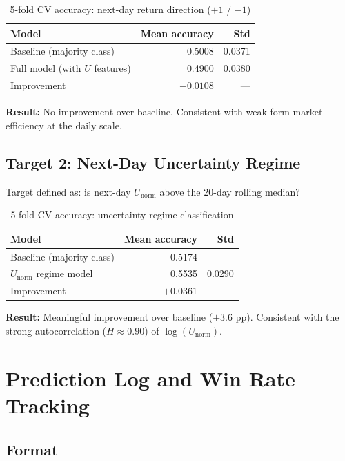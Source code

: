 \documentclass[11pt]{article}
\begin{document}
\begin{table}[htbp]
\centering
\caption{5-fold CV accuracy: next-day return direction ($+1$ / $-1$)}
\begin{tabular}{lrr}
\toprule
Model & Mean accuracy & Std \\
\midrule
Baseline (majority class) & 0.5008 & 0.0371 \\
Full model (with $U$ features) & 0.4900 & 0.0380 \\
Improvement & $-0.0108$ & --- \\
\bottomrule
\end{tabular}
\end{table}

\textbf{Result:} No improvement over baseline. Consistent with weak-form market efficiency at the daily scale.

\subsection{Target 2: Next-Day Uncertainty Regime}

Target defined as: is next-day $U_\mathrm{norm}$ above the 20-day rolling median?

\begin{table}[htbp]
\centering
\caption{5-fold CV accuracy: uncertainty regime classification}
\begin{tabular}{lrr}
\toprule
Model & Mean accuracy & Std \\
\midrule
Baseline (majority class) & 0.5174 & --- \\
$U_\mathrm{norm}$ regime model & 0.5535 & 0.0290 \\
Improvement & $+0.0361$ & --- \\
\bottomrule
\end{tabular}
\end{table}

\textbf{Result:} Meaningful improvement over baseline ($+3.6$ pp). Consistent with the strong autocorrelation ($H \approx 0.90$) of $\log(U_\mathrm{norm})$.

\section{Prediction Log and Win Rate Tracking}

\subsection{Format}
\end{document}
